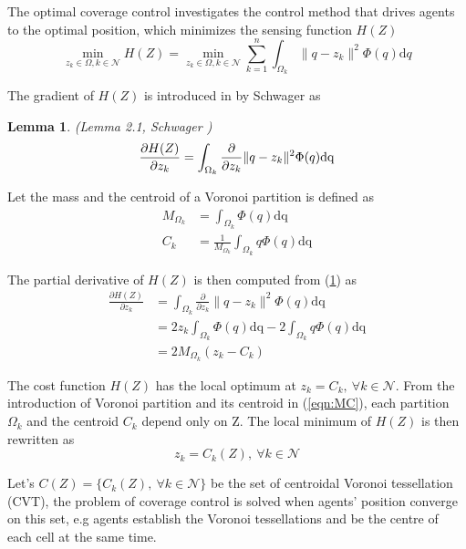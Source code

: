 \documentclass[journal]{IEEEtran}
\newtheorem{lemma}{Lemma}
\begin{document}
{	The optimal coverage control investigates the control method that drives agents to the optimal position, which  minimizes the sensing function $H(Z)$
	\[\min_{z_k \in \Omega, k \in \mathcal{N}} H(Z) = \min_{z_k \in \Omega, k \in \mathcal{N}}  \sum_{k = 1}^{n} \int_{\Omega_k} \|q-z_k\|^2 \Phi(q) \mathrm{d}q\] 
	
	The gradient of $H(Z)$ is introduced in \cite{Schwager} by Schwager as 
	\begin{lemma} (Lemma 2.1, Schwager ) \label{remark:Schwager}
		\begin{equation}  \notag
			\frac{\partial H(Z)}{\partial z_k} = \int_{\Omega_k} \frac{\partial }{\partial z_k} \|q-z_k\|^2 \Phi(q) \mathrm{dq} \\
		\end{equation}
	\end{lemma}
	
 	Let the mass and the centroid of a Voronoi partition is defined as
 	\begin{equation}  \label{eqn:MC}
 	\begin{split}
 		M_{\Omega_k} & = \int_{\Omega_k}\Phi(q) \mathrm{dq} \\
 		C_k & = \frac{1}{M_{\Omega_k}} \int_{\Omega_k}q\Phi(q) \mathrm{dq}
 	\end{split}
 	\end{equation}
 	
 	The partial derivative of $H(Z)$ is then computed from (\ref{remark:Schwager}) as
	\begin{equation}  \label{eqn:dH}
	\begin{split}
	\frac{\partial H(Z)}{\partial z_k} & = \int_{\Omega_k} \frac{\partial }{\partial z_k} \|q-z_k\|^2 \Phi(q) \mathrm{dq} \\
	& = 2 z_k\int_{\Omega_k} \Phi(q) \mathrm{dq} - 2 \int_{\Omega_k} q\Phi(q) \mathrm{dq} \\
	& = 2M_{\Omega_k}(z_k - C_k)
	\end{split}
	\end{equation} 	
	}

	{\color{red}
	The cost function $H(Z)$ has the local optimum at $z_k = C_k, ~ \forall k \in \mathcal{N}$. From the introduction of Voronoi partition and its centroid in (\ref{eqn:MC}), each partition $\Omega_k$ and the centroid $C_k$ depend only on Z. The local minimum of $H(Z)$ is then rewritten as
	\begin{equation}
	    z_k = C_k(Z), ~\forall k \in \mathcal{N}
	\end{equation}
	
	Let's $C(Z) = \{C_k(Z),  ~ \forall k \in \mathcal{N}\}$ be the set of centroidal Voronoi tessellation (CVT), the problem of coverage control is solved when agents' position converge on this set, e.g agents establish the Voronoi tessellations and be the centre of each cell at the same time. 
	}
\end{document}
